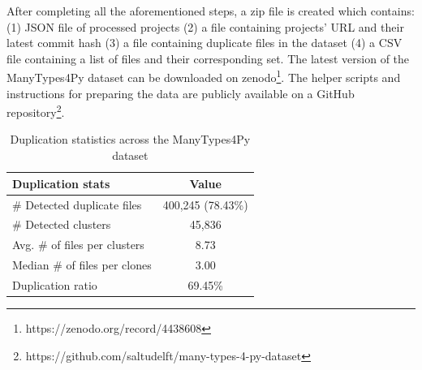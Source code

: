 \documentclass[10pt, conference]{IEEEtran}
\begin{document}
After completing all the aforementioned steps, a zip file is created which contains: (1) JSON file of processed projects (2) a file containing projects' URL and their latest commit hash (3) a file containing duplicate files in the dataset (4) a CSV file containing a list of files and their corresponding set. The latest version of the ManyTypes4Py dataset can be downloaded on zenodo\footnote{https://zenodo.org/record/4438608}. The helper scripts and instructions for preparing the data are publicly available on a GitHub repository\footnote{https://github.com/saltudelft/many-types-4-py-dataset}.

\begin{table}[!t]
	\centering
	\label{tab:dup-stats}
	\caption{Duplication statistics across the ManyTypes4Py dataset}
	\begin{tabular}{l c}
		\toprule
		Duplication stats & Value \\
		\midrule
		\# Detected duplicate files & 400,245 (78.43\%) \\
		\# Detected clusters & 45,836 \\
		Avg. \# of files per clusters & 8.73 \\
		Median \# of files per clones & 3.00 \\
		Duplication ratio & 69.45\% \\
		\bottomrule
	\end{tabular}
\end{table}
\end{document}
